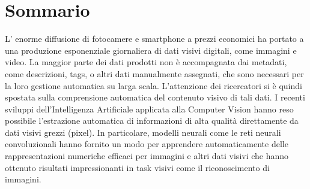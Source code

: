 \chapter*{Sommario}
\lettrine{L'}{} enorme diffusione di fotocamere e smartphone a prezzi economici ha portato a una produzione esponenziale giornaliera di dati visivi digitali, come immagini e video.
La maggior parte dei dati prodotti non è accompagnata dai metadati, come descrizioni, tags, o altri dati manualmente assegnati, che sono necessari per la loro gestione automatica su larga scala.
L'attenzione dei ricercatori si è quindi spostata sulla comprensione automatica del contenuto visivo di tali dati.
I recenti sviluppi dell'Intelligenza Artificiale applicata alla Computer Vision hanno reso possibile l'estrazione automatica di informazioni di alta qualità direttamente da dati visivi grezzi (pixel).
In particolare, modelli neurali come le reti neurali convoluzionali hanno fornito un modo per apprendere automaticamente delle rappresentazioni numeriche efficaci per immagini e altri dati visivi che hanno ottenuto risultati impressionanti in task visivi come il riconoscimento di immagini.

